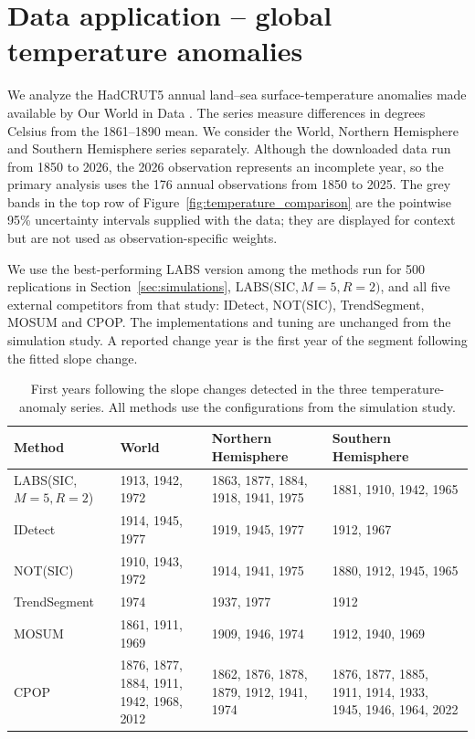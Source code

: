 \documentclass[12pt, a4paper]{article}
\begin{document}
\section{Data application -- global temperature anomalies}
\label{sec:data}

We analyze the HadCRUT5 annual land--sea surface-temperature anomalies made
available by Our World in Data \citep{owidtemp}.  The series measure differences in degrees
Celsius from the 1861--1890 mean.  We consider the World, Northern Hemisphere
and Southern Hemisphere series separately.  Although the downloaded data run
from 1850 to 2026, the 2026 observation represents an incomplete year, so the
primary analysis uses the 176 annual observations from 1850 to 2025.  The grey
bands in the top row of Figure~\ref{fig:temperature_comparison} are the
pointwise 95\% uncertainty intervals supplied with the data; they are displayed
for context but are not used as observation-specific weights.

We use the best-performing LABS version among the methods run for 500
replications in Section~\ref{sec:simulations},
$\mathrm{LABS(SIC,}M=5,R=2)$, and all five external competitors from that
study: IDetect, NOT(SIC), TrendSegment, MOSUM and CPOP.  The implementations
and tuning are unchanged from the simulation study.  A reported change year
is the first year of the segment following the fitted slope change.  

\begin{table}[h]
\centering
\small
\setlength{\tabcolsep}{4pt}
\begin{tabular}{p{1.20in}p{1.20in}p{1.66in}p{1.66in}}
\hline
Method & World & Northern Hemisphere & Southern Hemisphere \\
\hline
LABS(SIC,\newline $M=5,R=2$) & 1913, 1942, 1972 & 1863, 1877, 1884, 1918, 1941, 1975 & 1881, 1910, 1942, 1965 \\
IDetect & 1914, 1945, 1977 & 1919, 1945, 1977 & 1912, 1967 \\
NOT(SIC) & 1910, 1943, 1972 & 1914, 1941, 1975 & 1880, 1912, 1945, 1965 \\
TrendSegment & 1974 & 1937, 1977 & 1912 \\
MOSUM & 1861, 1911, 1969 & 1909, 1946, 1974 & 1912, 1940, 1969 \\
CPOP & 1876, 1877, 1884, 1911, 1942, 1968, 2012 & 1862, 1876, 1878, 1879, 1912, 1941, 1974 & 1876, 1877, 1885, 1911, 1914, 1933, 1945, 1946, 1964, 2022 \\
\hline
\end{tabular}
\caption{First years following the slope changes detected in the three
temperature-anomaly series.  All methods use the configurations from the
simulation study.}
\label{tab:temperature_changes}
\end{table}
\end{document}
